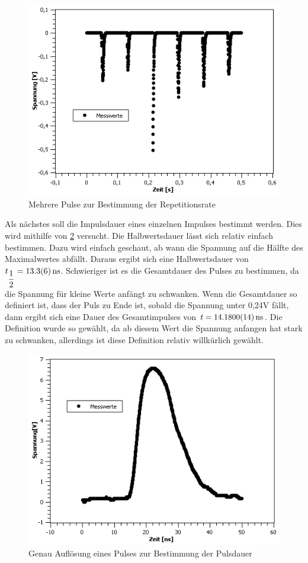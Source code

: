 \documentclass[
	a4paper,
	12pt,
	pagesize,
	ngerman
]{scrartcl}
\begin{document}
\begin{figure}[h!]
	\centering
	\includegraphics[scale=0.7]{Rep.png}
	\caption{Mehrere Pulse zur Bestimmung der Repetitionsrate}
	\label{Rep}
\end{figure}


Als nächstes soll die Impulsdauer eines einzelnen Impulses bestimmt werden. Dies wird mithilfe von \cref{Pulsdauer} versucht. Die Halbwertsdauer lässt sich relativ einfach bestimmen. Dazu wird einfach geschaut, ab wann die Spannung auf die Hälfte des Maximalwertes abfällt. Daraus ergibt sich eine Halbwertsdauer von $t_{\dfrac{1}{2}} = \SI{13,3 \pm 0,6}{ns}$. Schwieriger ist es die Gesamtdauer des Pulses zu bestimmen, da die Spannung für kleine Werte anfängt zu schwanken. Wenn die Gesamtdauer so definiert ist, dass der Puls zu Ende ist, sobald die Spannung unter 0,24V fällt, dann ergibt sich eine Dauer des Gesamtimpulses von $t = \SI{14,180 \pm 0,0014}{ns}$. Die Definition wurde so gewählt, da ab diesem Wert die Spannung anfangen hat stark zu schwanken, allerdings ist diese Definition relativ willkürlich gewählt. 

\begin{figure}[h!]
	\centering
	\includegraphics[scale=0.7]{Pulsdauer.png}
	\caption{Genau Auflösung eines Pulses zur Bestimmung der Pulsdauer}
	\label{Pulsdauer}
\end{figure}
\end{document}
